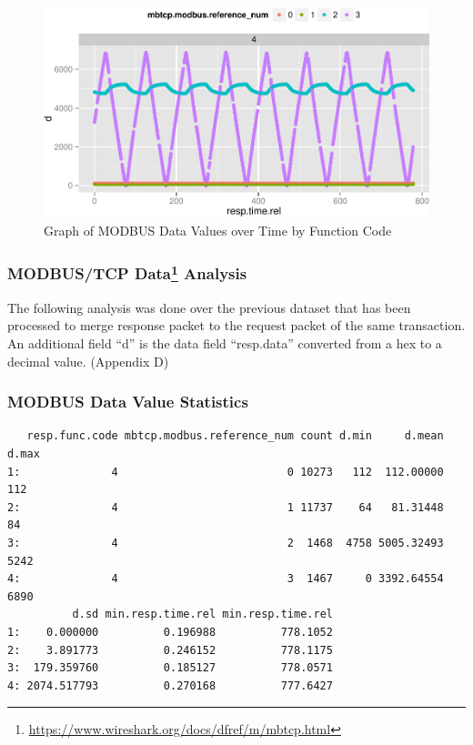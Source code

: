 \documentclass[11pt,]{article}
\let\rmarkdownfootnote\footnote%
\def\footnote{\protect\rmarkdownfootnote}
\begin{document}
\begin{figure}

{\centering \includegraphics{thesis_files/figure-latex/unnamed-chunk-27-1} 

}

\caption{Graph of MODBUS Data Values over Time by Function Code}\label{fig:unnamed-chunk-27}
\end{figure}

\subsubsection[MODBUS/TCP Data Analysis]{MODBUS/TCP Data\footnote{\url{https://www.wireshark.org/docs/dfref/m/mbtcp.html}}
Analysis}\label{modbustcp-data9-analysis}

The following analysis was done over the previous dataset that has been
processed to merge response packet to the request packet of the same
transaction. An additional field ``d'' is the data field ``resp.data''
converted from a hex to a decimal value. (Appendix D)

\subsubsection{MODBUS Data Value
Statistics}\label{modbus-data-value-statistics}

\begin{verbatim}
   resp.func.code mbtcp.modbus.reference_num count d.min     d.mean d.max
1:              4                          0 10273   112  112.00000   112
2:              4                          1 11737    64   81.31448    84
3:              4                          2  1468  4758 5005.32493  5242
4:              4                          3  1467     0 3392.64554  6890
          d.sd min.resp.time.rel min.resp.time.rel
1:    0.000000          0.196988          778.1052
2:    3.891773          0.246152          778.1175
3:  179.359760          0.185127          778.0571
4: 2074.517793          0.270168          777.6427
\end{verbatim}
\end{document}
